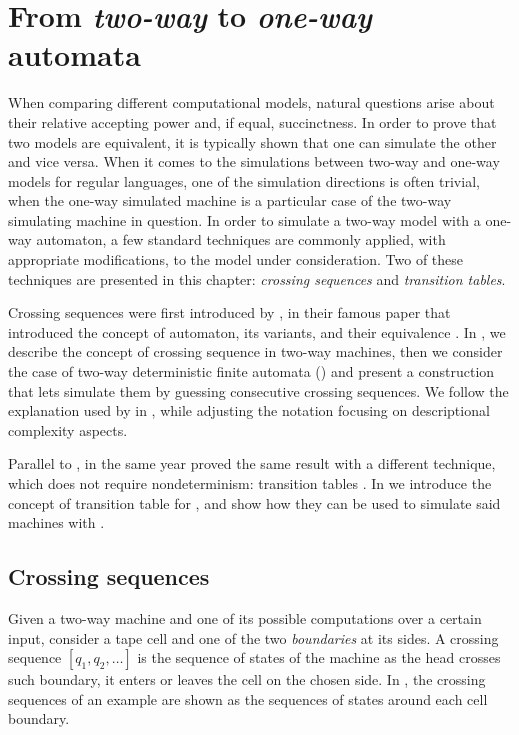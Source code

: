 \chapter{From \emph{two-way} to \emph{one-way} automata}\label{ch:techniques}
When comparing different computational models, natural questions arise about their relative accepting power and, if equal, succinctness.
In order to prove that two models are equivalent, it is typically shown that one can simulate the other and vice versa.
When it comes to the simulations between two-way and one-way models for regular languages, one of the simulation directions is often trivial, when the one-way simulated machine is a particular case of the two-way simulating machine in question.
In order to simulate a two-way model with a one-way automaton, a few standard techniques are commonly applied, with appropriate modifications, to the model under consideration.
Two of these techniques are presented in this chapter: \emph{crossing sequences} and \emph{transition tables}.

Crossing sequences were first introduced by \citeauthor{RabSco59}, in their famous \citeyear{RabSco59} paper that introduced the concept of automaton, its variants, and their equivalence \cite{RabSco59}.
In , we describe the concept of crossing sequence in two-way machines, then we consider the case of two-way deterministic finite automata (\TDFAs) and present a construction that lets \ONFAs simulate them by guessing consecutive crossing sequences.
We follow the explanation used by \citeauthor{HopUll79} in \cite{HopUll79}, while adjusting the notation focusing on descriptional complexity aspects.

Parallel to \citeauthor{RabSco59}, in the same year \citeauthor{She59} proved the same result with a different technique, which does not require nondeterminism: transition tables \cite{She59}.
In  we introduce the concept of transition table for \TDFAs, and show how they can be used to simulate said machines with \ODFAs.


\section{Crossing sequences}\label{sec:crossseq2DFA}
Given a two-way machine and one of its possible computations over a certain input, consider a tape cell and one of the two \emph{boundaries} at its sides.
A crossing sequence $[q_1,q_2,\dots]$ is the sequence of states of the machine as the head crosses such boundary, \ie it enters or leaves the cell on the chosen side.
In , the crossing sequences of an example \TDFA are shown as the sequences of states around each cell boundary.

